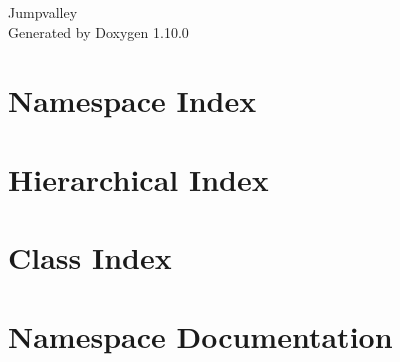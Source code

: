 \documentclass[twoside]{book}
\newcommand{\+}{\discretionary{\mbox{\scriptsize$\hookleftarrow$}}{}{}}
\newcommand{\clearemptydoublepage}{%
    \newpage{\pagestyle{empty}\cleardoublepage}%
  }
\begin{document}
  \raggedbottom
    \hypersetup{pageanchor=false,
                bookmarksnumbered=true,
                pdfencoding=unicode
               }
  \begin{titlepage}
  \vspace*{7cm}
  \begin{center}%
  {\Large Jumpvalley}\\
  \vspace*{1cm}
  {\large Generated by Doxygen 1.10.0}\\
  \end{center}
  \end{titlepage}
  \clearemptydoublepage
  \tableofcontents
  \clearemptydoublepage
  \hypersetup{pageanchor=true}
\chapter{Namespace Index}

\chapter{Hierarchical Index}

\chapter{Class Index}

\chapter{Namespace Documentation}

















\end{document}
